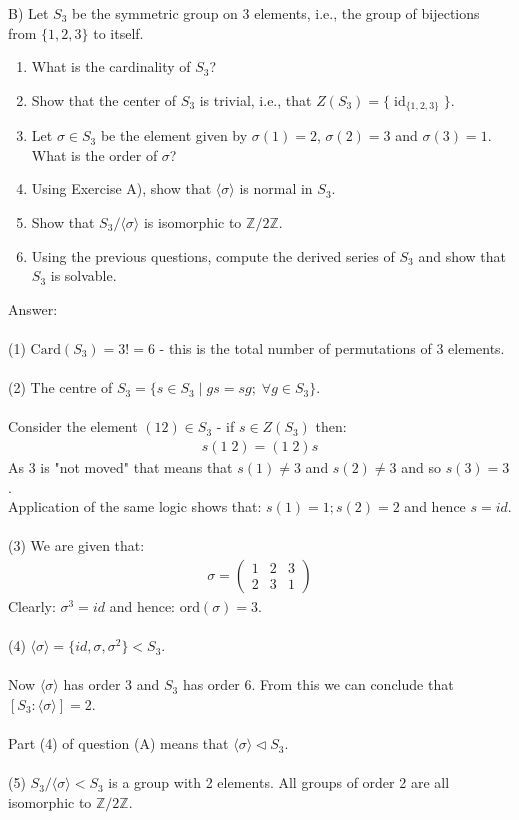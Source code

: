 \documentclass[12pt,a4paper]{article}
\begin{document}
\newpage
\noindent
B) Let $S_3$ be the symmetric group on $3$ elements, i.e., the group of bijections from $\{1,2,3\}$ to itself.
\begin{enumerate}
\renewcommand{\labelenumi}{(\arabic{enumi})}
\item What is the cardinality of $S_3$?
\item Show that the center of $S_3$ is trivial, i.e., that $Z(S_3)=\{\operatorname{id}_{\{1,2,3\}}\}$.
\item Let $\sigma\in S_3$ be the element given by $\sigma(1)=2$, $\sigma(2)=3$ and $\sigma(3)=1$. What is the order of $\sigma$?
\item Using Exercise A), show that $\langle\sigma\rangle$ is normal in $S_3$.
\item Show that $S_3/\langle\sigma\rangle$ is isomorphic to $\mathbb{Z}/2\mathbb{Z}$.
\item Using the previous questions, compute the derived series of $S_3$ and show that $S_3$ is solvable.
\end{enumerate}

\vspace{1cm}
\noindent
Answer:\\
\\
(1) $\text{Card}(S_3) = 3! = 6$ - this is the total number of permutations of 3 elements.\\
\\
(2) The centre of $S_3 = \{s \in S_3 \; | \; g s = s g; \; \forall g \in S_3 \}$.\\
\\
Consider the element $(1 2) \in S_3$ - if $s \in Z(S_3)$ then:
\begin{align*}
    s(1 \; 2) = (1 \; 2)s
\end{align*}
As 3 is "not moved" that means that $s(1) \ne 3$ and $s(2) \ne 3$ and so $s(3)=3$.\\
Application of the same logic shows that: $s(1)=1; s(2)=2$ and hence $s=id$.\\
\\
(3) We are given that:
\begin{align*}
\sigma =
\begin{pmatrix}
1 & 2 & 3 \\
2 & 3 & 1
\end{pmatrix}
\end{align*}
Clearly: $\sigma^3=id$ and hence: $\text{ord}(\sigma)=3$.\\
\\
(4) $\langle \sigma \rangle = \{id, \sigma, \sigma^2 \} < S_3$.\\
\\
Now $\langle \sigma \rangle$ has order 3 and $S_3$ has order 6.  From this we can conclude that
$[S_3 : \langle \sigma \rangle]=2$.\\
\\
Part (4) of question (A) means that $\langle \sigma \rangle \triangleleft S_3$.\\
\\
(5) $S_3 / \langle \sigma \rangle < S_3$ is a group with 2 elements.  All groups of order 2 are
all isomorphic to $\mathbb{Z} / 2 \mathbb{Z}$.
\end{document}
